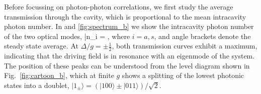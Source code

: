 Before focussing on photon-photon correlations, we first
study
the average transmission through the cavity, which is proportional
to the mean intracavity photon number. In
 and \ref{fig:spectrum_b} we show the 
intracavity photon number of the
two optical modes,
\bel
	\label{eq:nAvg}
	\bar n_i = ,
\eel
where $i =a,s$, and angle brackets denote the steady state average.
At $\Delta/g =
\pm \frac{1}{2}$, both transmission curves exhibit a maximum,
indicating that the driving field is in resonance 
with an eigenmode of the system.
The position of these peaks can be  understood from the level diagram shown
in Fig.~\ref{fig:cartoon_b}, which at finite $g$ shows a splitting
of the lowest photonic states into a doublet, $|1_\pm\rangle=(|100\rangle
\pm|011\rangle)/\sqrt{2}$.

